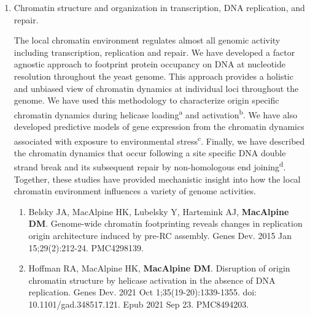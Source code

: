 \documentclass{update_nihbiosketch}
\begin{document}
\begin{enumerate}
\item Chromatin structure and organization in transcription, DNA replication, and repair.   

The local chromatin environment regulates almost all genomic activity including transcription, replication and repair.  We have developed a factor agnostic approach to footprint  protein occupancy on DNA at nucleotide resolution throughout the yeast genome.  This approach provides a holistic and unbiased view of chromatin dynamics at individual loci throughout the genome.  We have used this methodology to characterize origin specific chromatin dynamics during helicase loading\textsuperscript{a} and activation\textsuperscript{b}. We have also developed predictive models of gene expression from the chromatin dynamics associated with exposure to environmental stress\textsuperscript{c}. Finally, we have described the chromatin dynamics that occur following a site specific DNA double strand break and its subsequent repair by non-homologous end joining\textsuperscript{d}.  Together, these studies have provided mechanistic insight into how the local chromatin environment influences a variety of genome activities.  


\begin{enumerate}
\setlength\itemsep{0.35em}


\item Belsky JA, MacAlpine HK, Lubelsky Y, Hartemink AJ, \textbf{MacAlpine DM}. Genome-wide chromatin footprinting reveals changes in replication origin architecture induced by pre-RC assembly. Genes Dev. 2015 Jan 15;29(2):212-24. PMC4298139.

\item Hoffman RA, MacAlpine HK, \textbf{MacAlpine DM}. Disruption of origin chromatin structure by helicase activation in the absence of DNA replication. Genes Dev. 2021 Oct 1;35(19-20):1339-1355. doi: 10.1101/gad.348517.121. Epub 2021 Sep 23. PMC8494203.


\end{enumerate}
\end{enumerate}
\end{document}
